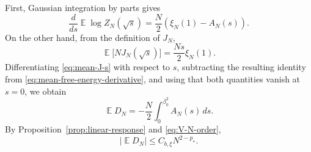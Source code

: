 \documentclass[letterpaper,11pt,reqno]{amsart}
\renewcommand{\leq}{\leqslant}
\DeclareMathOperator{\E}{\mathds{E}}
\begin{document}
First, Gaussian integration by parts gives
\begin{equation}
\frac{d}{ds}\E\log Z_N(\sqrt{s})
=
\frac N2\left(\xi_N(1)-A_N(s)\right).
\label{eq:mean-free-energy-derivative}
\end{equation}
On the other hand, from the definition of $J_N$,
\begin{equation}
\E\bigl[NJ_N(\sqrt{s})\bigr]
=
\frac{Ns}{2}\xi_N(1).
\label{eq:mean-J-s}
\end{equation}
Differentiating \eqref{eq:mean-J-s} with respect to $s$, subtracting
the resulting identity from \eqref{eq:mean-free-energy-derivative},
and using that both quantities vanish at $s=0$, we obtain
\begin{equation}
\E D_N
=
-\frac N2\int_0^{\beta_0^2}A_N(s)\,ds.
\label{eq:mean-D-exact}
\end{equation}
By Proposition~\ref{prop:linear-response} and
\eqref{eq:V-N-order},
\begin{equation}
|\E D_N|
\leq
C_{b,\xi}N^{2-p_\star}.
\label{eq:mean-D-bound}
\end{equation}
\end{document}
